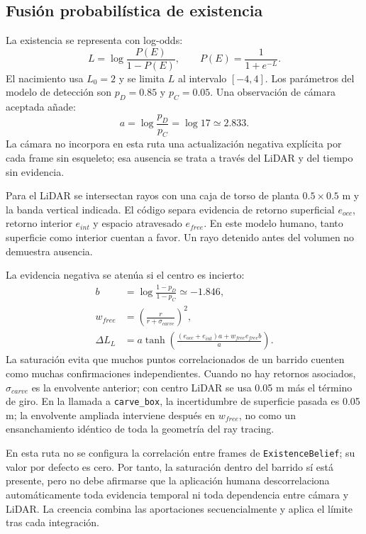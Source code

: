 \documentclass[11pt,a4paper]{article}
\newcommand{\code}[1]{\nolinkurl{#1}}
\begin{document}
\subsection{Fusión probabilística de existencia}
La existencia se representa con log-odds:
\begin{equation}
 L=\log\frac{P(E)}{1-P(E)},\qquad P(E)=\frac{1}{1+e^{-L}}.
\end{equation}
El nacimiento usa $L_0=2$ y se limita $L$ al intervalo $[-4,4]$. Los parámetros del
modelo de detección son $p_D=0.85$ y $p_C=0.05$. Una observación de cámara aceptada
añade:
\begin{equation}
 a=\log\frac{p_D}{p_C}=\log17\simeq2.833.
\end{equation}
La cámara no incorpora en esta ruta una actualización negativa explícita por cada
frame sin esqueleto; esa ausencia se trata a través del LiDAR y del tiempo sin
evidencia.~\cite{humanlidar,humanworker,existence}

Para el LiDAR se intersectan rayos con una caja de torso de planta $0.5\times0.5$ m
y la banda vertical indicada. El código separa evidencia de retorno superficial
$e_{occ}$, retorno interior $e_{int}$ y espacio atravesado $e_{free}$. En este modelo
humano, tanto superficie como interior cuentan a favor. Un rayo detenido antes del
volumen no demuestra ausencia.~\cite{humanlidar,existence}

La evidencia negativa se atenúa si el centro es incierto:
\begin{align}
 b&=\log\frac{1-p_D}{1-p_C}\simeq-1.846,\\
 w_{free}&=\left(\frac{r}{r+\sigma_{carve}}\right)^2,\\
 \Delta L_L&=a\tanh\left(
 \frac{(e_{occ}+e_{int})a+w_{free}e_{free}b}{a}\right).
\end{align}
La saturación evita que muchos puntos correlacionados de un barrido cuenten como
muchas confirmaciones independientes. Cuando no hay retornos asociados,
$\sigma_{carve}$ es la envolvente anterior; con centro LiDAR se usa 0.05 m más el
término de giro. En la llamada a \code{carve_box}, la incertidumbre de superficie
pasada es 0.05 m; la envolvente ampliada interviene después en $w_{free}$, no como
un ensanchamiento idéntico de toda la geometría del ray tracing.~\cite{humanlidar}

En esta ruta no se configura la correlación entre frames de
\code{ExistenceBelief}; su valor por defecto es cero. Por tanto, la saturación dentro
del barrido sí está presente, pero no debe afirmarse que la aplicación humana
descorrelaciona automáticamente toda evidencia temporal ni toda dependencia entre
cámara y LiDAR. La creencia combina las aportaciones secuencialmente y aplica el
límite tras cada integración.~\cite{existence,humanfitter,humanlidar}
\end{document}

